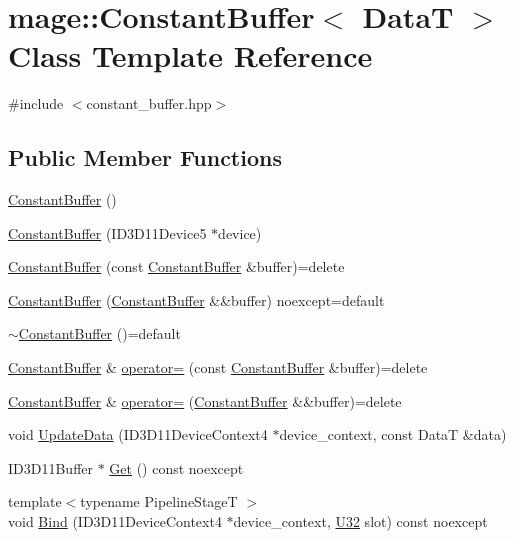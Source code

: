 \hypertarget{classmage_1_1_constant_buffer}{}\section{mage\+:\+:Constant\+Buffer$<$ DataT $>$ Class Template Reference}
\label{classmage_1_1_constant_buffer}


{\ttfamily \#include $<$constant\+\_\+buffer.\+hpp$>$}

\subsection*{Public Member Functions}
\begin{DoxyCompactItemize}
\item 
\hyperlink{classmage_1_1_constant_buffer_a3badd88f8570d6622f6eb33c7420a87d}{Constant\+Buffer} ()
\item 
\hyperlink{classmage_1_1_constant_buffer_aaf32ac894aa2fe73bcbd9033e6e7efb0}{Constant\+Buffer} (I\+D3\+D11\+Device5 $\ast$device)
\item 
\hyperlink{classmage_1_1_constant_buffer_a67fe42cb52e63e38474b6c65341fbe82}{Constant\+Buffer} (const \hyperlink{classmage_1_1_constant_buffer}{Constant\+Buffer} \&buffer)=delete
\item 
\hyperlink{classmage_1_1_constant_buffer_aeb0642e0e405eeb18658c0962a52f406}{Constant\+Buffer} (\hyperlink{classmage_1_1_constant_buffer}{Constant\+Buffer} \&\&buffer) noexcept=default
\item 
\hyperlink{classmage_1_1_constant_buffer_a874e9507ea3b6d2f630f061c2fc6d2d0}{$\sim$\+Constant\+Buffer} ()=default
\item 
\hyperlink{classmage_1_1_constant_buffer}{Constant\+Buffer} \& \hyperlink{classmage_1_1_constant_buffer_acb1a4f4b656073609075b5e89dea6973}{operator=} (const \hyperlink{classmage_1_1_constant_buffer}{Constant\+Buffer} \&buffer)=delete
\item 
\hyperlink{classmage_1_1_constant_buffer}{Constant\+Buffer} \& \hyperlink{classmage_1_1_constant_buffer_ad050b1f0f03a5fcd2b51977a744781a3}{operator=} (\hyperlink{classmage_1_1_constant_buffer}{Constant\+Buffer} \&\&buffer)=delete
\item 
void \hyperlink{classmage_1_1_constant_buffer_aa9a12f5975b1b53b5b174e563d77aaf7}{Update\+Data} (I\+D3\+D11\+Device\+Context4 $\ast$device\+\_\+context, const DataT \&data)
\item 
I\+D3\+D11\+Buffer $\ast$ \hyperlink{classmage_1_1_constant_buffer_a6b8fcbd873ffbda96d7412c581d5a29a}{Get} () const noexcept
\item 
{\footnotesize template$<$typename Pipeline\+StageT $>$ }\\void \hyperlink{classmage_1_1_constant_buffer_a7592eed823334cdc3da614121f2b25ca}{Bind} (I\+D3\+D11\+Device\+Context4 $\ast$device\+\_\+context, \hyperlink{namespacemage_a41c104c036fba3756a74e19f793eeaa1}{U32} slot) const noexcept
\end{DoxyCompactItemize}
